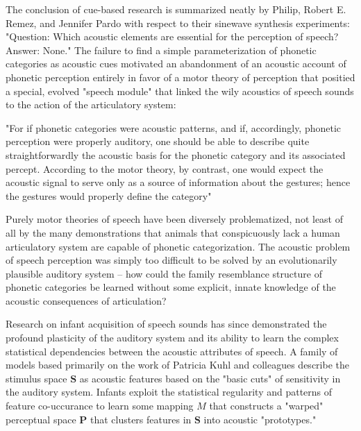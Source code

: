 \begin{multicols}{2}
The conclusion of cue-based research is summarized neatly by Philip, Robert E. Remez, and Jennifer Pardo with respect to their sinewave synthesis experiments: "Question: Which acoustic elements are essential for the perception of speech? Answer: None\cite{HaskinsLaboratories2020}." The failure to find a simple parameterization of phonetic categories as acoustic cues motivated an abandonment of an acoustic account of phonetic perception entirely in favor of a motor theory of perception that positied a special, evolved "speech module" that linked the wily acoustics of speech sounds to the action of the articulatory system:

\begin{leftbar}
"For if phonetic categories were acoustic patterns, and if, accordingly, phonetic perception were properly auditory, one should be able to describe quite straightforwardly the acoustic basis for the phonetic category and its associated percept. According to the motor theory, by contrast, one would expect the acoustic signal to serve only as a source of information about the gestures; hence the gestures would properly define the category"
\cite{Liberman1985a}
\end{leftbar}

Purely motor theories of speech have been diversely problematized, not least of all by the many demonstrations that animals that conspicuously lack a human articulatory system are capable of phonetic categorization\cite{Carbonell2014,Lotto1997,Kluender2000}. The acoustic problem of speech perception was simply too difficult to be solved by an evolutionarily plausible auditory system -- how could the family resemblance structure of phonetic categories be learned without some explicit, innate knowledge of the acoustic consequences of articulation?\cite{Bailey1980} 

Research on infant acquisition of speech sounds has since demonstrated the profound plasticity of the auditory system and its ability to learn the complex statistical dependencies between the acoustic attributes of speech\cite{kuhlNewViewLanguage2000}. A family of models based primarily on the work of Patricia Kuhl and colleagues describe the stimulus space $\mathbf{S}$ as acoustic features based on the "basic cuts" of sensitivity in the auditory system\cite{kuhlEarlyLanguageAcquisition2004}. Infants exploit the statistical regularity and patterns of feature co-uccurance to learn some mapping $M$ that constructs a "warped" perceptual space $\mathbf{P}$ that clusters features in $\mathbf{S}$ into acoustic "prototypes."\cite{kuhlNewViewLanguage2000} 


\end{multicols}
